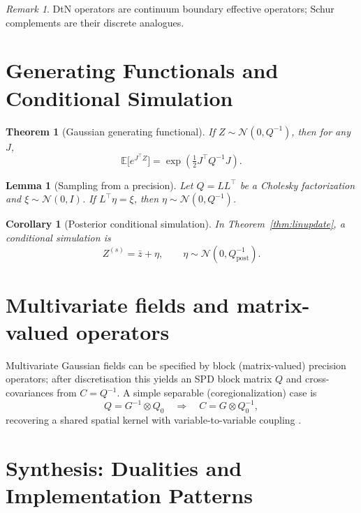 \documentclass[11pt]{article}
\theoremstyle{definition}
\theoremstyle{plain}
\newtheorem{theorem}{Theorem}[section]
\newtheorem{lemma}{Lemma}[section]
\newtheorem{corollary}{Corollary}[section]
\theoremstyle{remark}
\newtheorem{remark}{Remark}[section]
\begin{document}
\begin{remark}
DtN operators are continuum boundary effective operators; Schur complements are their discrete analogues.
\end{remark}

\section{Generating Functionals and Conditional Simulation}\label{sec:path}

\begin{theorem}[Gaussian generating functional]\label{thm:genfun}
If $Z\sim\mathcal{N}(0,Q^{-1})$, then for any $J$,
\[
\mathbb{E}\big[e^{J^\top Z}\big]=\exp\!\left(\tfrac12 J^\top Q^{-1}J\right).
\]
\end{theorem}

\begin{lemma}[Sampling from a precision]\label{lem:sampling}
Let $Q=LL^\top$ be a Cholesky factorization and $\xi\sim\mathcal{N}(0,I)$.
If $L^\top \eta=\xi$, then $\eta\sim\mathcal{N}(0,Q^{-1})$.
\end{lemma}

\begin{corollary}[Posterior conditional simulation]\label{cor:postsamp}
In Theorem~\ref{thm:linupdate}, a conditional simulation is
\[
Z^{(s)}=\bar z+\eta,\qquad \eta\sim\mathcal{N}(0,Q_{\mathrm{post}}^{-1}).
\]
\end{corollary}

\section{Multivariate fields and matrix-valued operators}\label{sec:multivariate}

Multivariate Gaussian fields can be specified by block (matrix-valued) precision operators; after discretisation this yields an SPD block matrix $Q$ and cross-covariances from $C=Q^{-1}$.
A simple separable (coregionalization) case is
\[
Q = G^{-1}\otimes Q_0 \quad\Rightarrow\quad C=G\otimes Q_0^{-1},
\]
recovering a shared spatial kernel with variable-to-variable coupling \citep{ChilesDelfiner2012}.

\section{Synthesis: Dualities and Implementation Patterns}\label{sec:synthesis}
\end{document}
